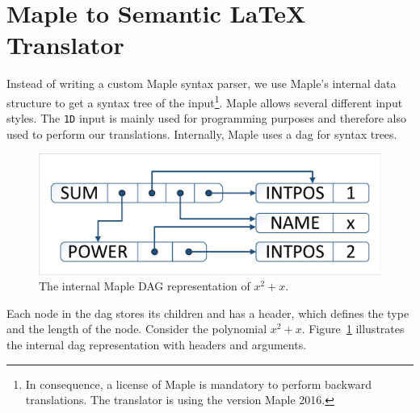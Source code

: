 \documentclass[a4paper,11pt]{article}
\newcommand{\Maple}{Maple}
\theoremstyle{defTheoStyle}
\theoremstyle{defExampStyle}
\begin{document}
\section{\Maple{} to Semantic \LaTeX{} Translator}\label{sec:backward-translation}
Instead of writing a custom \Maple{} syntax parser, we use \Maple's internal data structure to get a syntax tree of the input\footnote{In consequence, a license of \Maple{} is mandatory to perform backward translations. The translator is using the version \Maple{} 2016.}. \Maple{} allows several different input styles. The \texttt{1D} input is mainly used for programming purposes and therefore also used to perform our translations. Internally, \Maple{} uses a \gls*{dag} for syntax trees.

\begin{figure}
	\vspace{-15pt}
	\centering
	\includegraphics[clip, trim=0.5cm 0.5cm 0.5cm 0.5cm, scale=0.5]{DAGreal.pdf}
	\vspace{-5pt}
	\caption{The internal \Maple{} DAG representation of $x^2+x$.}
	\label{fig:internal-maple-dag}
\end{figure}

Each node in the \gls*{dag} stores its children and has a header, which defines the type and the length of the node. Consider the polynomial $x^2+x$. Figure~\ref{fig:internal-maple-dag} illustrates the internal \gls*{dag} representation with headers and arguments.
\end{document}
